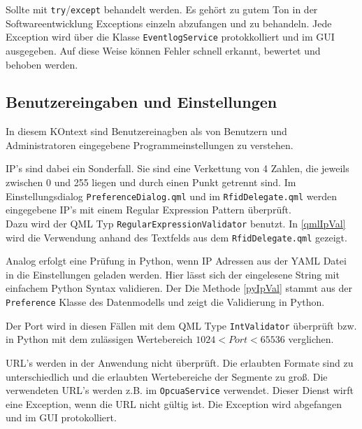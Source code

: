 Sollte mit \verb|try|/\verb|except| behandelt werden. Es gehört zu gutem Ton in der Softwareentwicklung Exceptions einzeln abzufangen und zu behandeln. 
Jede Exception wird über die Klasse \verb|EventlogService| protokkolliert und im GUI ausgegeben.
Auf diese Weise können Fehler schnell erkannt, bewertet und behoben werden.

\subsection{Benutzereingaben und Einstellungen}

In diesem KOntext sind Benutzereinagben als von Benutzern und Administratoren eingegebene Programmeinstellungen zu verstehen. 

IP's sind dabei ein Sonderfall. Sie sind eine Verkettung von 4 Zahlen, die jeweils zwischen 0 und 255 liegen und durch einen Punkt getrennt sind.
Im Einstellungsdialog \verb|PreferenceDialog.qml| und im \verb|RfidDelegate.qml| werden eingegebene IP's mit einem 
Regular Expression Pattern überprüft. \\
Dazu wird der QML Typ \verb|RegularExpressionValidator| benutzt. 
In \ref{qmlIpVal} wird die Verwendung anhand des Textfelds aus dem \verb|RfidDelegate.qml| gezeigt.

Analog erfolgt eine Prüfung in Python, wenn IP Adressen aus der YAML Datei in die Einstellungen geladen werden.
Hier lässt sich der eingelesene String mit einfachem Python Syntax validieren. 
Der Die Methode \ref{pyIpVal} stammt aus der \verb|Preference| Klasse des Datenmodells und zeigt die Validierung in Python.





Der Port wird in diesen Fällen mit dem QML Type \verb|IntValidator| überprüft bzw. in Python mit dem zulässigen Wertebereich
$1024< Port < 65536$ verglichen.

URL's werden in der Anwendung nicht überprüft. 
Die erlaubten Formate sind zu unterschiedlich und die erlaubten Wertebereiche der Segmente zu groß.
Die verwendeten URL's werden z.B. im \verb|OpcuaService| verwendet. Dieser Dienst wirft eine Exception, wenn die URL nicht gültig ist. 
Die Exception wird abgefangen und im GUI protokolliert. 

